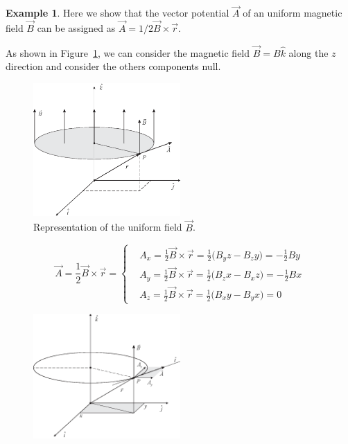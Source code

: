 \documentclass[11pt,a4paper,oneside]{book}
\numberwithin{equation}{section}
\theoremstyle{it}
\theoremstyle{definition}
\newtheorem{example}{Example}[section]
\begin{document}
\begin{example}
Here we show that the vector potential $\vec{A}$ of an uniform magnetic field $\vec{B}$ can be assigned as $\vec{A}=1/2\vec{B}\times\vec{r}$. 	

As shown in Figure~\ref{morosi_620_1}, we can consider the magnetic field $\vec{B} = B\hat{k}$ along the $z$ direction and consider the others components null.
\begin{figure}[H]
	\centering
	\includegraphics[width = 0.5\textwidth, width = 250pt, angle = 0, keepaspectratio]{figures/morosi_620_1.eps}
	\captionsetup{width=0.75\textwidth}		
	\caption{Representation of the uniform field $\vec{B}$.}
	\label{morosi_620_1}
\end{figure}
\begin{equation}
	\vec{A}=\frac{1}{2}\vec{B}\times\vec{r}=\left\lbrace 
	\begin{aligned}
	&A_x=\frac{1}{2}\vec{B}\times\vec{r} = \frac{1}{2}\Big(B_yz-B_zy\Big)=-\frac{1}{2}By \\[8pt]
	&A_y=\frac{1}{2}\vec{B}\times\vec{r} = \frac{1}{2}\Big(B_zx-B_xz\Big)=-\frac{1}{2}Bx \\[8pt]
	&A_z=\frac{1}{2}\vec{B}\times\vec{r} = \frac{1}{2}\Big(B_xy-B_yx\Big)=0
	\end{aligned}\right. 
\end{equation}
\begin{figure}[H]
	\centering
	\includegraphics[width = 0.5\textwidth, width = 250pt, angle = 0, keepaspectratio]{figures/morosi_620_2.eps}

\end{figure}
\end{example}
\end{document}
